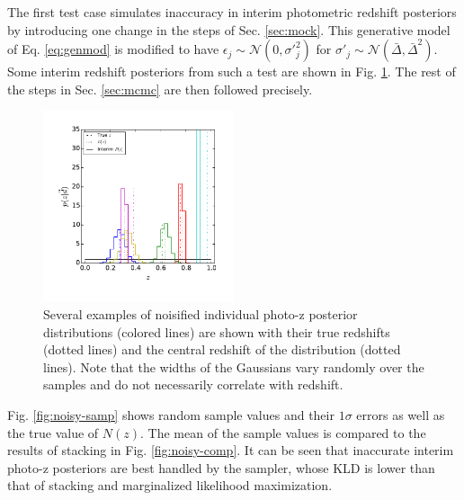\documentclass[preprint]{aastex}
\begin{document}
The first test case simulates inaccuracy in interim photometric redshift 
posteriors by introducing one change in the steps of Sec. \ref{sec:mock}.  This 
generative model of Eq. \ref{eq:genmod} is modified to have 
$\epsilon_{j}\sim\mathcal{N}(0,\sigma'^{2}_{j})$ for 
$\sigma'_{j}\sim\mathcal{N}(\bar{\Delta},\bar{\Delta}^{2})$.  Some interim 
redshift posteriors from such a test are shown in Fig. \ref{fig:noisypzs}.  The 
rest of the steps in Sec. \ref{sec:mcmc} are then followed precisely.

\begin{figure}
\includegraphics[width=0.5\textwidth]{figs/vars/samplepzs.pdf}
\caption{Several examples of noisified individual photo-z posterior 
distributions (colored lines) are shown with their true redshifts (dotted 
lines) and the central redshift of the distribution (dotted lines).  Note that 
the widths of the Gaussians vary randomly over the samples and do not 
necessarily correlate with redshift.}
\label{fig:noisypzs}
\end{figure}

Fig. \ref{fig:noisy-samp} shows random sample values and their $1\sigma$ errors 
as well as the true value of $N(z)$.  The mean of the sample values is compared 
to the results of stacking in Fig. \ref{fig:noisy-comp}.  It can be seen that 
inaccurate interim photo-z posteriors are best handled by the sampler, whose 
KLD is lower than that of stacking and marginalized likelihood maximization.
\end{document}
